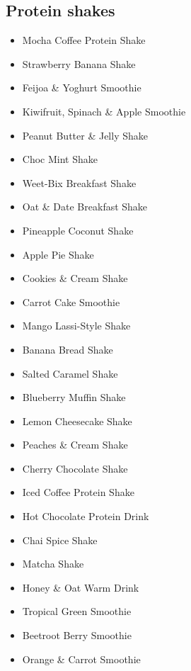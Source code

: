 \subsection*{Protein shakes}
\begin{itemize}
  \item \todo Mocha Coffee Protein Shake
  \item \todo Strawberry Banana Shake
  \item \todo Feijoa \& Yoghurt Smoothie
  \item \todo Kiwifruit, Spinach \& Apple Smoothie
  \item \todo Peanut Butter \& Jelly Shake
  \item \todo Choc Mint Shake
  \item \todo Weet-Bix Breakfast Shake
  \item \todo Oat \& Date Breakfast Shake
  \item \todo Pineapple Coconut Shake
  \item \todo Apple Pie Shake
  \item \todo Cookies \& Cream Shake
  \item \todo Carrot Cake Smoothie
  \item \todo Mango Lassi-Style Shake
\end{itemize}

\begin{itemize}
  \item \todo Banana Bread Shake
  \item \todo Salted Caramel Shake
  \item \todo Blueberry Muffin Shake
  \item \todo Lemon Cheesecake Shake
  \item \todo Peaches \& Cream Shake
  \item \todo Cherry Chocolate Shake
\end{itemize}

\begin{itemize}
  \item \todo Iced Coffee Protein Shake
  \item \todo Hot Chocolate Protein Drink
  \item \todo Chai Spice Shake
  \item \todo Matcha Shake
  \item \todo Honey \& Oat Warm Drink
\end{itemize}

\begin{itemize}
  \item \todo Tropical Green Smoothie
  \item \todo Beetroot Berry Smoothie
  \item \todo Orange \& Carrot Smoothie
\end{itemize}
